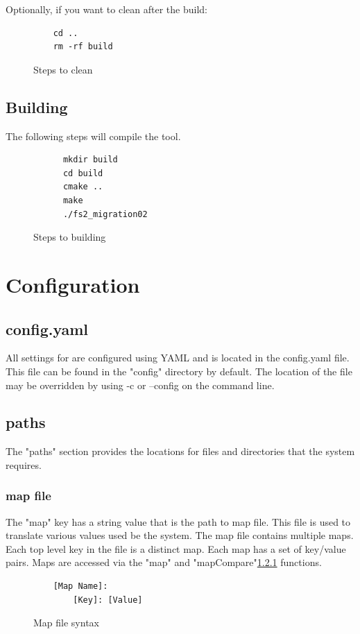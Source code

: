 \documentclass[]{article}
\begin{document}
Optionally, if you want to clean after the build:
\begin{figure}[H]
	\begin{lstlisting}
	cd ..
	rm -rf build
	\end{lstlisting}
	\caption{Steps to clean}
\end{figure}


\subsection{Building \protect }
The following steps will compile the  tool. 
\begin{figure}[H]
	\begin{lstlisting}
	  mkdir build
	  cd build
	  cmake ..
	  make
	  ./fs2_migration02
	\end{lstlisting}
	\caption{Steps to building}
\end{figure}

\section{Configuration}
\subsection{config.yaml}
All settings for \protect are configured using YAML and is located in the config.yaml file. This file can be found in the "config" directory by default. The location of the file may be overridden by using -c or --config on the command line.

\subsection{paths}
The "paths" section provides the locations for files and directories that the system requires.

\subsubsection{map file}
The "map" key has a string value that is the path to map file. This file is used to translate various values used be the system. The map file contains multiple maps. 
Each top level key in the file is a distinct map. Each map has a set of key/value pairs.
Maps are accessed via the "map"\pageref{} and "mapCompare"\ref{} functions.

\begin{figure}[H]
	\begin{lstlisting}
	[Map Name]:
	    [Key]: [Value]
	\end{lstlisting}
	\caption{Map file syntax}
\end{figure}
\end{document}
